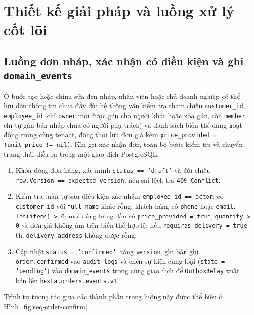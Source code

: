 \section{Thiết kế giải pháp và luồng xử lý cốt lõi}


\subsection{Luồng đơn nháp, xác nhận có điều kiện và ghi \texttt{domain\_\hspace{0pt}events}}
Ở bước tạo hoặc chỉnh sửa đơn nháp, nhân viên hoặc chủ doanh nghiệp có thể lưu dần thông tin chưa đầy đủ; hệ thống vẫn kiểm tra tham chiếu \texttt{customer\_\hspace{0pt}id}, \texttt{employee\_\hspace{0pt}id} (chỉ \texttt{owner} mới được gán cho người khác hoặc xóa gán, còn \texttt{member} chỉ tự gán bản nháp chưa có người phụ trách) và danh sách biến thể đang hoạt động trong cùng tenant, đồng thời lưu đơn giá kèm \texttt{price\_\hspace{0pt}provided = (unit\_\hspace{0pt}price != nil)}.
Khi gọi xác nhận đơn, toàn bộ bước kiểm tra và chuyển trạng thái diễn ra trong một giao dịch PostgreSQL:
\begin{enumerate}
  \item Khóa dòng đơn hàng, xác minh \texttt{status == 'draft'} và đối chiếu \texttt{row.\hspace{0pt}Version == expected\_\hspace{0pt}version}; nếu sai lệch trả \texttt{409 Conflict}.
  \item Kiểm tra tuần tự sáu điều kiện xác nhận: \texttt{employee\_\hspace{0pt}id == actor}; có \texttt{customer\_\hspace{0pt}id} với \texttt{full\_\hspace{0pt}name} khác rỗng; khách hàng có \texttt{phone} hoặc \texttt{email}; \texttt{len(items) > 0}; mọi dòng hàng đều có \texttt{price\_\hspace{0pt}provided = true}, \texttt{quantity > 0} và đơn giá không âm trên biến thể hợp lệ; nếu \texttt{requires\_\hspace{0pt}delivery = true} thì \texttt{delivery\_\hspace{0pt}address} không được rỗng.
  \item Cập nhật \texttt{status = 'confirmed'}, tăng \texttt{version}, ghi bản ghi \texttt{order.\hspace{0pt}confirmed} vào \texttt{audit\_\hspace{0pt}logs} và chèn sự kiện cùng loại (\texttt{state = 'pending'}) vào \texttt{domain\_\hspace{0pt}events} trong cùng giao dịch để \texttt{Outbox\hspace{0pt}Relay} xuất bản lên \texttt{hexta.\hspace{0pt}orders.\hspace{0pt}events.\hspace{0pt}v1}.
\end{enumerate}
Trình tự tương tác giữa các thành phần trong luồng này được thể hiện ở Hình~\ref{fig:seq-order-confirm}.

